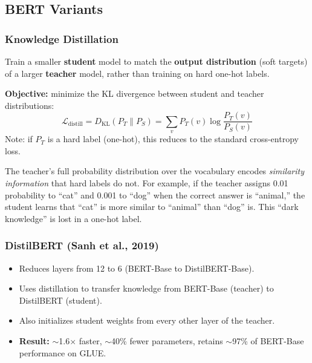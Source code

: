 \documentclass[11pt, a4paper]{article}
\begin{document}
\subsection{BERT Variants}

\subsubsection{Knowledge Distillation}

\begin{defbox}
Train a smaller \textbf{student} model to match the \textbf{output distribution} (soft targets) of a larger \textbf{teacher} model, rather than training on hard one-hot labels.

\textbf{Objective:} minimize the KL divergence between student and teacher distributions:
\[
\mathcal{L}_{\text{distill}} = D_{\text{KL}}(P_T \| P_S) = \sum_v P_T(v) \log \frac{P_T(v)}{P_S(v)}
\]
Note: if $P_T$ is a hard label (one-hot), this reduces to the standard cross-entropy loss.
\end{defbox}

\begin{notebox}
The teacher's full probability distribution over the vocabulary encodes \emph{similarity information} that hard labels do not. For example, if the teacher assigns 0.01 probability to ``cat'' and 0.001 to ``dog'' when the correct answer is ``animal,'' the student learns that ``cat'' is more similar to ``animal'' than ``dog'' is. This ``dark knowledge'' is lost in a one-hot label.
\end{notebox}

\subsubsection{DistilBERT (Sanh et al., 2019)}

\begin{itemize}[leftmargin=2em]
  \item Reduces layers from 12 to 6 (BERT-Base to DistilBERT-Base).
  \item Uses distillation to transfer knowledge from BERT-Base (teacher) to DistilBERT (student).
  \item Also initializes student weights from every other layer of the teacher.
  \item \textbf{Result:} $\sim$1.6$\times$ faster, $\sim$40\% fewer parameters, retains $\sim$97\% of BERT-Base performance on GLUE.
\end{itemize}
\end{document}
